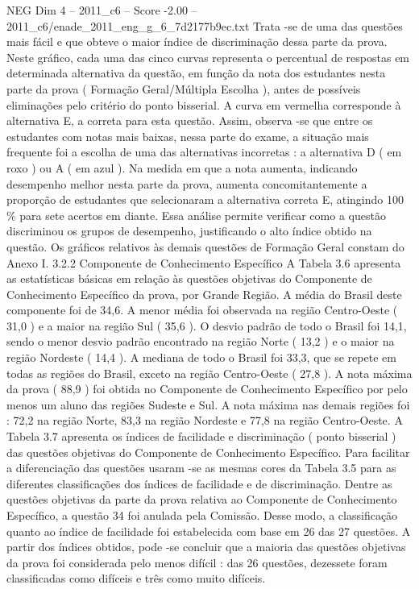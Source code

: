 \begin{textsample}{NEG Dim 4 – 2011\_c6 – Score -2.00 – 2011\_c6/enade\_2011\_eng\_g\_6\_7d2177b9ec.txt}
Trata -se de uma das questões mais fácil e que obteve o maior índice de discriminação dessa parte da prova.
Neste gráfico, cada uma das cinco curvas representa o percentual de respostas em determinada alternativa da questão, em função da nota dos estudantes nesta parte da prova ( Formação Geral/Múltipla Escolha ), antes de possíveis eliminações pelo critério do ponto bisserial.
A curva em vermelha corresponde à alternativa E, a correta para esta questão.
Assim, observa -se que entre os estudantes com notas mais baixas, nessa parte do exame, a situação mais frequente foi a escolha de uma das alternativas incorretas : a alternativa D ( em roxo ) ou A ( em azul ).
Na medida em que a nota aumenta, indicando desempenho melhor nesta parte da prova, aumenta concomitantemente a proporção de estudantes que selecionaram a alternativa correta E, atingindo 100 \% para sete acertos em diante.
Essa análise permite verificar como a questão discriminou os grupos de desempenho, justificando o alto índice obtido na questão.
Os gráficos relativos às demais questões de Formação Geral constam do Anexo I. 3.2.2 Componente de Conhecimento Específico A Tabela 3.6 apresenta as estatísticas básicas em relação às questões objetivas do Componente de Conhecimento Específico da prova, por Grande Região.
A média do Brasil deste componente foi de 34,6.
A menor média foi observada na região Centro-Oeste ( 31,0 ) e a maior na região Sul ( 35,6 ).
O desvio padrão de todo o Brasil foi 14,1, sendo o menor desvio padrão encontrado na região Norte ( 13,2 ) e o maior na região Nordeste ( 14,4 ).
A mediana de todo o Brasil foi 33,3, que se repete em todas as regiões do Brasil, exceto na região Centro-Oeste ( 27,8 ).
A nota máxima da prova ( 88,9 ) foi obtida no Componente de Conhecimento Específico por pelo menos um aluno das regiões Sudeste e Sul.
A nota máxima nas demais regiões foi : 72,2 na região Norte, 83,3 na região Nordeste e 77,8 na região Centro-Oeste.
A Tabela 3.7 apresenta os índices de facilidade e discriminação ( ponto bisserial ) das questões objetivas do Componente de Conhecimento Específico.
Para facilitar a diferenciação das questões usaram -se as mesmas cores da Tabela 3.5 para as diferentes classificações dos índices de facilidade e de discriminação.
Dentre as questões objetivas da parte da prova relativa ao Componente de Conhecimento Específico, a questão 34 foi anulada pela Comissão.
Desse modo, a classificação quanto ao índice de facilidade foi estabelecida com base em 26 das 27 questões.
A partir dos índices obtidos, pode -se concluir que a maioria das questões objetivas da prova foi considerada pelo menos difícil : das 26 questões, dezessete foram classificadas como difíceis e três como muito difíceis.

\end{textsample}
